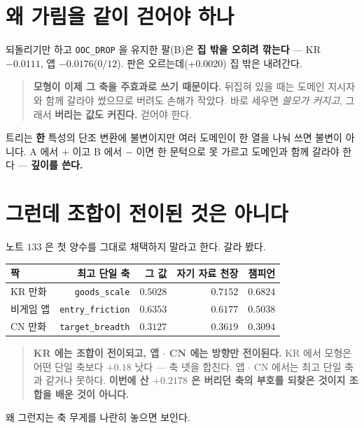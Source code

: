 \documentclass[11pt]{article}
\begin{document}
\section{왜 가림을 같이 걷어야 하나}

되돌리기만 하고 \texttt{OOC\_DROP} 을 유지한 팔(B)은 \textbf{집 밖을 오히려
깎는다} --- KR $-0.0111$, 앱 $-0.0176$($0/12$). 판은 오르는데(+0.0020)
집 밖은 내려간다.

\begin{quote}
\textbf{모형이 이제 그 축을 주효과로 쓰기 때문이다.} 뒤집혀 있을 때는
도메인 지시자와 함께 갈라야 썼으므로 버려도 손해가 작았다. 바로 세우면
\emph{쓸모가 커지고}, 그래서 \textbf{버리는 값도 커진다.} 걷어야 한다.
\end{quote}

트리는 \textbf{한} 특성의 단조 변환에 불변이지만 여러 도메인이 한 열을
나눠 쓰면 불변이 아니다. A 에서 $+$ 이고 B 에서 $-$ 이면 한 문턱으로 못
가르고 도메인과 함께 갈라야 한다 --- \textbf{깊이를 쓴다.}

\section{그런데 조합이 전이된 것은 아니다}

노트 $133$ 은 첫 양수를 그대로 채택하지 말라고 한다. 갈라 봤다.

\begin{center}
\begin{tabular}{lrrrr}
\hline
짝 & 최고 단일 축 & 그 값 & 자기 자료 천장 & 챔피언 \\
\hline
KR 만화 & \texttt{goods\_scale} & $0.5028$ & $0.7152$ & $\mathbf{0.6824}$ \\
비게임 앱 & \texttt{entry\_friction} & $\mathbf{0.6353}$ & $0.6177$ & $0.5038$ \\
CN 만화 & \texttt{target\_breadth} & $0.3127$ & $0.3619$ & $0.3094$ \\
\hline
\end{tabular}
\end{center}

\begin{quote}
\textbf{KR 에는 조합이 전이되고, 앱 $\cdot$ CN 에는 방향만 전이된다.}
KR 에서 모형은 어떤 단일 축보다 $+0.18$ 낫다 --- 축 넷을 합친다.
앱 $\cdot$ CN 에서는 최고 단일 축과 같거나 못하다.
\textbf{이번에 산 $+0.2178$ 은 버리던 축의 부호를 되찾은 것이지 조합을
배운 것이 아니다.}
\end{quote}

왜 그런지는 축 무게를 나란히 놓으면 보인다.
\end{document}
